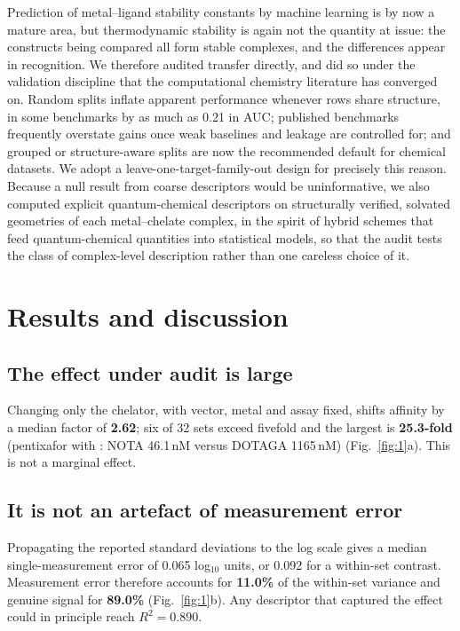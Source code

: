 Prediction of metal--ligand stability constants by machine learning is by now a mature area, but thermodynamic stability is again not the quantity at issue: the constructs being compared all form stable complexes, and the differences appear in recognition. We therefore audited transfer directly, and did so under the validation discipline that the computational chemistry literature has converged on. Random splits inflate apparent performance whenever rows share structure, in some benchmarks by as much as 0.21 in AUC;\cite{Kim2026TAS2R} published benchmarks frequently overstate gains once weak baselines and leakage are controlled for;\cite{McGreivy2024Weak,Schuh2026Audit} and grouped or structure-aware splits are now the recommended default for chemical datasets.\cite{Boldini2025UMAP,Tropsha2025Eval} We adopt a leave-one-target-family-out design for precisely this reason. Because a null result from coarse descriptors would be uninformative, we also computed explicit quantum-chemical descriptors on structurally verified, solvated geometries of each metal--chelate complex, in the spirit of hybrid schemes that feed quantum-chemical quantities into statistical models,\cite{Kang2025QSAR} so that the audit tests the class of complex-level description rather than one careless choice of it.

\section{Results and discussion}

\subsection{The effect under audit is large}

Changing only the chelator, with vector, metal and assay fixed, shifts affinity by a median factor of \textbf{2.62}; six of 32 sets exceed fivefold and the largest is \textbf{25.3-fold} (pentixafor with : NOTA 46.1\,nM versus DOTAGA 1165\,nM\cite{Poschenrieder2016a}) (Fig.~\ref{fig:1}a). This is not a marginal effect.

\subsection{It is not an artefact of measurement error}

Propagating the reported standard deviations to the log scale gives a median single-measurement error of 0.065 log$_{10}$ units, or 0.092 for a within-set contrast. Measurement error therefore accounts for \textbf{11.0\%} of the within-set variance and genuine signal for \textbf{89.0\%} (Fig.~\ref{fig:1}b). Any descriptor that captured the effect could in principle reach $R^2 = 0.890$.

